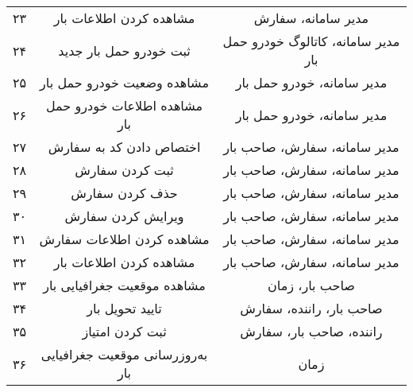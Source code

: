 \begin{table}
\begin{longtable}{|c|c|c|}
	۲۳ & مشاهده کردن اطلاعات بار & مدیر سامانه، سفارش \\
	۲۴ & ثبت خودرو حمل بار جدید & مدیر سامانه، کاتالوگ خودرو حمل بار \\
	۲۵ & مشاهده وضعیت خودرو حمل بار & مدیر سامانه، خودرو حمل بار \\
	۲۶ & مشاهده اطلاعات خودرو حمل بار & مدیر سامانه، خودرو حمل بار \\
	۲۷ & اختصاص دادن کد به سفارش & مدیر سامانه، سفارش، صاحب بار \\
	۲۸ & ثبت کردن سفارش & مدیر سامانه، سفارش، صاحب بار \\
	۲۹ & حذف کردن سفارش & مدیر سامانه، سفارش، صاحب بار \\
	۳۰ & ویرایش کردن سفارش & مدیر سامانه، سفارش،‌ صاحب بار \\
	۳۱ & مشاهده کردن اطلاعات سفارش & مدیر سامانه، سفارش، صاحب بار \\
	۳۲ & مشاهده کردن اطلاعات بار & مدیر سامانه، سفارش، صاحب بار \\
	۳۳ & مشاهده موقعیت جغرافیایی بار & صاحب بار، زمان \\
	۳۴ & تایید تحویل بار & صاحب بار، راننده، سفارش \\
	۳۵ & ثبت کردن امتیاز & راننده، صاحب بار، سفارش \\
	۳۶ & به‌روزرسانی موقعیت جغرافیایی بار & زمان \\
	\end{longtable}
\end{table}
